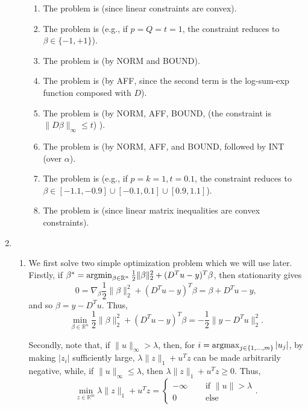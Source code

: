 \documentclass[11pt]{article}
\newcommand{\R}{\mathbb{R}} %
\newcommand{\argmin}{\operatornamewithlimits{argmin}}
\newcommand{\argmax}{\operatornamewithlimits{argmax}}
\begin{document}
\begin{enumerate}
\begin{enumerate}
\begin{enumerate}
\item The problem is  (since linear constraints are convex).

\item The problem is  (e.g., if $p = Q = t = 1$, the
constraint reduces to $\beta \in \{-1,+1\}$).

\item The problem is  (by NORM and BOUND).

\item The problem is  (by AFF, since the second term is the
log-sum-exp function composed with $D$).

\item The problem is  (by NORM, AFF, BOUND, (the constraint is
$\|D\beta\|_\infty \leq t$)
).

\item The problem is  (by NORM, AFF, and BOUND, followed by INT
(over $\alpha$).

\item The problem is  (e.g., if $p = k = 1, t = 0.1$, the
constraint reduces to $\beta \in [-1.1,-0.9] \cup [-0.1,0.1] \cup [0.9,1.1]$).

\item The problem is  (since linear matrix inequalities are convex
constraints).

\end{enumerate}
\end{enumerate}

\item
\begin{enumerate}
\item We first solve two simple optimization problem which we will use later.
Firstly, if
$\beta^*
    = \argmin_{\beta \in \R^n} \frac12 \|\beta\|_2^2 + (D^T u - y)^T \beta$,
then stationarity gives
\[0 = \nabla_\beta \frac12 \|\beta\|_2^2 + (D^T u - y)^T \beta
    = \beta + D^T u - y,\]
and so $\beta = y - D^T u$. Thus,
\begin{equation}
\min_{\beta \in \R^n} \frac12 \|\beta\|_2^2 + (D^T u - y)^T \beta
    = -\frac12 \|y - D^T u\|_2^2.
\label{opt:beta_min}
\end{equation}

Secondly, note that, if $\|u\|_\infty > \lambda$, then, for
$i = \argmax_{j \in \{1,\dots,m\}} |u_j|$, by making $|z_i|$ sufficiently
large, $\lambda\|z\|_1 + u^T z$ can be made arbitrarily negative, while, if
$\|u\|_\infty \leq \lambda$, then $\lambda\|z\|_1 + u^T z \geq 0$. Thus,
\begin{equation}
\min_{z \in \R^m} \lambda \|z\|_1 + u^T z
    = \left\{ \begin{array}{ll}
                    -\infty & \quad \mbox{ if } \|u\| > \lambda \\
                    0       & \quad \mbox{ else }
                \end{array} \right..
\label{opt:z_min}
\end{equation}


\end{enumerate}
\end{enumerate}
\end{document}
